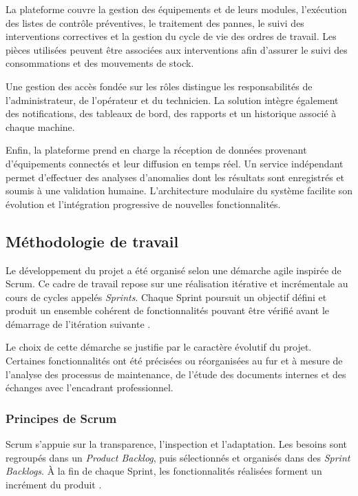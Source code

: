 La plateforme couvre la gestion des équipements et de leurs modules, l’exécution des listes de contrôle préventives, le traitement des pannes, le suivi des interventions correctives et la gestion du cycle de vie des ordres de travail. Les pièces utilisées peuvent être associées aux interventions afin d’assurer le suivi des consommations et des mouvements de stock.

Une gestion des accès fondée sur les rôles distingue les responsabilités de l’administrateur, de l’opérateur et du technicien. La solution intègre également des notifications, des tableaux de bord, des rapports et un historique associé à chaque machine.

Enfin, la plateforme prend en charge la réception de données provenant d’équipements connectés et leur diffusion en temps réel. Un service indépendant permet d’effectuer des analyses d’anomalies dont les résultats sont enregistrés et soumis à une validation humaine. L’architecture modulaire du système facilite son évolution et l’intégration progressive de nouvelles fonctionnalités.

\subsection{Méthodologie de travail}

Le développement du projet a été organisé selon une démarche agile inspirée de Scrum. Ce cadre de travail repose sur une réalisation itérative et incrémentale au cours de cycles appelés \textit{Sprints}. Chaque Sprint poursuit un objectif défini et produit un ensemble cohérent de fonctionnalités pouvant être vérifié avant le démarrage de l’itération suivante \cite{scrum_guide2020}.

Le choix de cette démarche se justifie par le caractère évolutif du projet. Certaines fonctionnalités ont été précisées ou réorganisées au fur et à mesure de l’analyse des processus de maintenance, de l’étude des documents internes et des échanges avec l’encadrant professionnel.

\subsubsection{Principes de Scrum}

Scrum s’appuie sur la transparence, l’inspection et l’adaptation. Les besoins sont regroupés dans un \textit{Product Backlog}, puis sélectionnés et organisés dans des \textit{Sprint Backlogs}. À la fin de chaque Sprint, les fonctionnalités réalisées forment un incrément du produit \cite{scrum_guide2020}.

